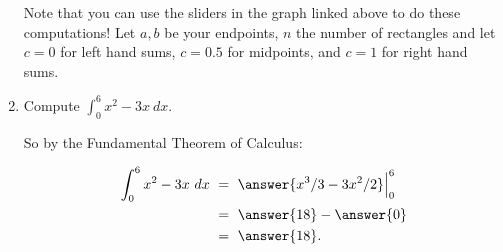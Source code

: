 \documentclass{ximera}
\begin{document}
\begin{question}
\begin{enumerate}
 Note that you can use the sliders in the  graph linked above to do these computations!  Let $a,b$ be your endpoints, $n$ the number of rectangles and let $c=0$ for left hand sums, $c=0.5$ for midpoints, and $c=1$ for right hand sums.


\item Compute $\displaystyle\int_0^6 x^2-3x\ dx$. 
\begin{explanation}
So by the Fundamental Theorem of Calculus:

\begin{align*}
\int_0^6 x^2-3x\ dx&\ =\ \answer{x^3/3-3x^2/2}\Big|_0^6\\
&\ =\ \answer{18}-\answer{0}\\
&\ =\ \answer{18}.
\end{align*}



\end{explanation}



\end{enumerate}


\end{question}
\end{document}
